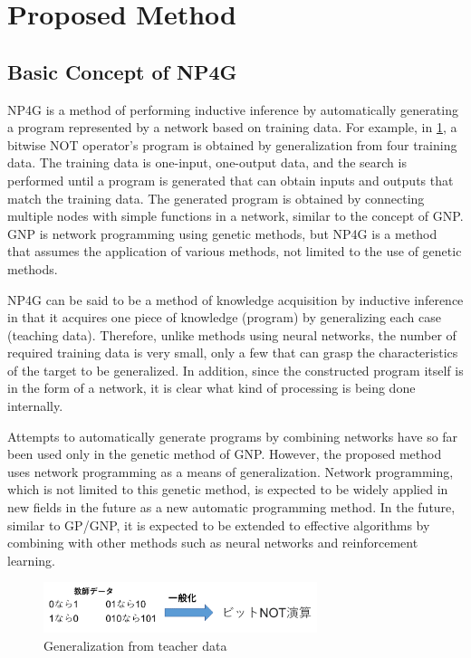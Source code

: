 \documentclass{article}
\begin{document}
\section {Proposed Method}
\subsection{Basic Concept of NP4G}
NP4G is a method of performing inductive inference by automatically generating a program represented by a network based on training data.
For example, in \ref{fig:summary}, a bitwise NOT operator's program is obtained by generalization from four training data.
The training data is one-input, one-output data, and the search is performed until a program is generated that can obtain inputs and outputs that match the training data.
The generated program is obtained by connecting multiple nodes with simple functions in a network, similar to the concept of GNP.
GNP is network programming using genetic methods, but NP4G is a method that assumes the application of various methods, not limited to the use of genetic methods.

NP4G can be said to be a method of knowledge acquisition by inductive inference in that it acquires one piece of knowledge (program) by generalizing each case (teaching data).
Therefore, unlike methods using neural networks, the number of required training data is very small, only a few that can grasp the characteristics of the target to be generalized.
In addition, since the constructed program itself is in the form of a network, it is clear what kind of processing is being done internally.

Attempts to automatically generate programs by combining networks have so far been used only in the genetic method of GNP.
However, the proposed method uses network programming as a means of generalization.
Network programming, which is not limited to this genetic method, is expected to be widely applied in new fields in the future as a new automatic programming method.
In the future, similar to GP/GNP, it is expected to be extended to effective algorithms by combining with other methods such as neural networks and reinforcement learning.

\begin{figure}[t]
\begin{center}
\includegraphics[width=80mm]{summary.png}
\end{center}
\caption {Generalization from teacher data}
\label{fig:summary}
\end{figure}
\end{document}
